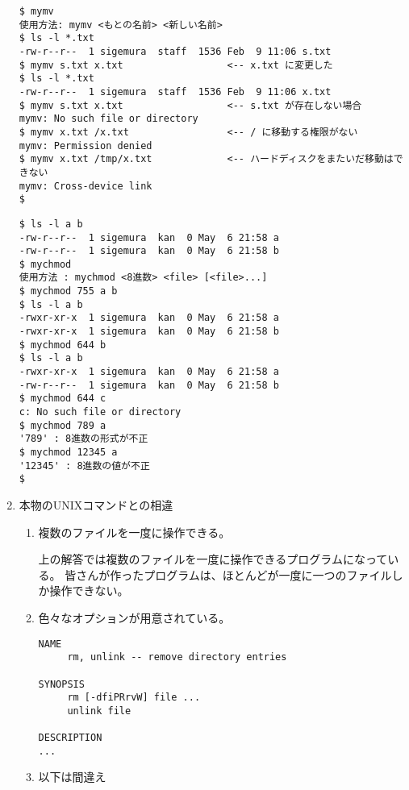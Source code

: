 \documentclass[a4j,twcolumn,11pt,nomag]{ltjarticle}      %
\begin{document}
\begin{enumerate}
\begin{lstlisting}[caption=mymvの実行例（動作テスト！！）]
$ mymv
使用方法: mymv <もとの名前> <新しい名前>
$ ls -l *.txt
-rw-r--r--  1 sigemura  staff  1536 Feb  9 11:06 s.txt
$ mymv s.txt x.txt                  <-- x.txt に変更した
$ ls -l *.txt
-rw-r--r--  1 sigemura  staff  1536 Feb  9 11:06 x.txt
$ mymv s.txt x.txt                  <-- s.txt が存在しない場合
mymv: No such file or directory
$ mymv x.txt /x.txt                 <-- / に移動する権限がない
mymv: Permission denied
$ mymv x.txt /tmp/x.txt             <-- ハードディスクをまたいだ移動はできない
mymv: Cross-device link
$ 
\end{lstlisting}

\begin{lstlisting}[caption=mychmodの実行例（動作テスト！！）]
$ ls -l a b
-rw-r--r--  1 sigemura  kan  0 May  6 21:58 a
-rw-r--r--  1 sigemura  kan  0 May  6 21:58 b
$ mychmod
使用方法 : mychmod <8進数> <file> [<file>...]
$ mychmod 755 a b
$ ls -l a b
-rwxr-xr-x  1 sigemura  kan  0 May  6 21:58 a
-rwxr-xr-x  1 sigemura  kan  0 May  6 21:58 b
$ mychmod 644 b
$ ls -l a b
-rwxr-xr-x  1 sigemura  kan  0 May  6 21:58 a
-rw-r--r--  1 sigemura  kan  0 May  6 21:58 b
$ mychmod 644 c
c: No such file or directory
$ mychmod 789 a
'789' : 8進数の形式が不正
$ mychmod 12345 a
'12345' : 8進数の値が不正
$
\end{lstlisting}

\item 本物のUNIXコマンドとの相違

\begin{enumerate}
\item 複数のファイルを一度に操作できる。

上の解答では複数のファイルを一度に操作できるプログラムになっている。
皆さんが作ったプログラムは、ほとんどが一度に一つのファイルしか操作できない。

\item 色々なオプションが用意されている。

\begin{lstlisting}[caption=rm コマンドのマニュアル（一部）]
NAME
     rm, unlink -- remove directory entries

SYNOPSIS
     rm [-dfiPRrvW] file ...
     unlink file

DESCRIPTION
...
\end{lstlisting}

\item 以下は間違え


\end{enumerate}
\end{enumerate}
\end{document}
